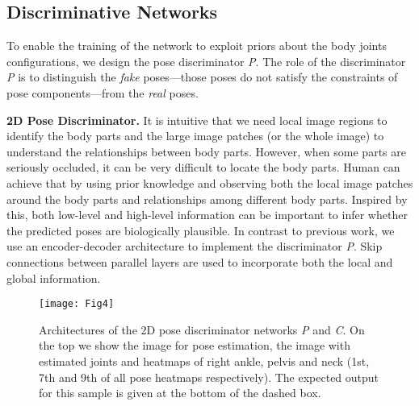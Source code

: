 \documentclass[10pt,journal,compsoc]{IEEEtran}
\begin{document}
%
%
%
%



\subsection{Discriminative Networks}\label{subsec:Pose-Discriminator}


To enable the training of the network to exploit priors about the body joints configurations, we design the pose discriminator \textit{P}.
The role of the discriminator \emph{P} is to distinguish the {\it fake} poses---those poses
do not satisfy the constraints of pose components---from the {\it real} poses.

\vspace{0.3em}
\noindent\textbf{2D   Pose   Discriminator.}
It is intuitive that we need local image regions to identify the body parts and the large image patches (or the whole image) to understand the relationships between body parts.
However, when some parts are seriously occluded, it can  be very difficult  to locate the body parts. Human can achieve that by  using prior knowledge and observing both the local image patches around the body parts and relationships among different body parts.
Inspired by this, both low-level and high-level information can be important to infer whether the predicted poses are biologically plausible.
In contrast to previous work, we use an encoder-decoder architecture to implement the discriminator \emph{P}.
Skip connections between parallel layers are used to incorporate both the local and global information.

\begin{figure}[!t]
\centering
\texttt{[image: Fig4]}
%
\caption{Architectures of the 2D pose discriminator networks \textit{P} and \textit{C}. On the top we show the image for pose estimation, the image with estimated joints and heatmaps of right ankle, pelvis and neck (1st, 7th and 9th of all pose heatmaps respectively). The expected output for this sample is given at the bottom of the dashed box.}
\label{fig:Architectures-of-P}
\end{figure}
\end{document}
